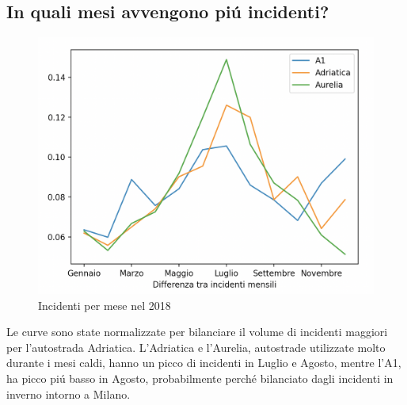 \documentclass[a4paper]{report}
\begin{document}
\subsection{In quali mesi avvengono pi\'u incidenti?}
\begin{figure}[!ht]
    \includegraphics[width=\linewidth]{../src/incidenti/incidenti_aci/autostrade/mesi_autostrade.png}
    \caption{Incidenti per mese nel 2018}
    \label{fig:incidenti_per_mese}
\end{figure}

Le curve sono state normalizzate per bilanciare il volume di incidenti maggiori per 
l'autostrada Adriatica.
L'Adriatica e l'Aurelia, autostrade utilizzate molto durante i mesi caldi, hanno un picco di 
incidenti in Luglio e Agosto, mentre l'A1, ha picco pi\'u basso in Agosto, probabilmente 
perch\'e bilanciato dagli incidenti in inverno intorno a Milano.
\end{document}
